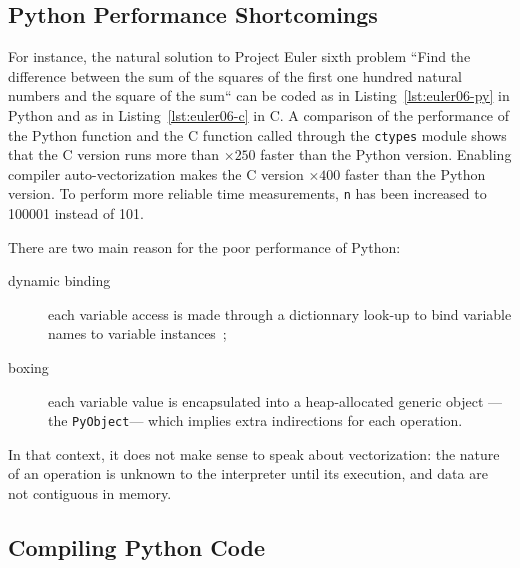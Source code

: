 \documentclass[preprint]{sigplanconf}
\begin{document}
\subsection{Python Performance Shortcomings}

For instance, the natural solution to Project Euler sixth problem ``Find the
difference between the sum of the squares of the first one hundred natural
numbers and the square of the sum`` can be coded as in
Listing~\ref{lst:euler06-py} in Python and as in Listing~\ref{lst:euler06-c} in
C. A comparison of the performance of the Python function and the C function
called through the \texttt{ctypes} module shows that the C version runs more
than $\times250$ faster than the Python version. Enabling compiler
auto-vectorization makes the C version $\times400$ faster than the Python
version. To perform more reliable time measurements, \texttt{n} has been
increased to 100001 instead of 101.

There are two main reason for the poor performance of Python:

\begin{description}

    \item[dynamic binding] each variable access is made through a dictionnary
        look-up to bind variable names to variable instances~;

    \item[boxing] each variable value is encapsulated into a heap-allocated
        generic object ---the \texttt{PyObject}--- which implies extra
        indirections for each operation.

\end{description}

In that context, it does not make sense to speak about vectorization: the
nature of an operation is unknown to the interpreter until its execution, and
data are not contiguous in memory.






\subsection{Compiling Python Code}
\end{document}

